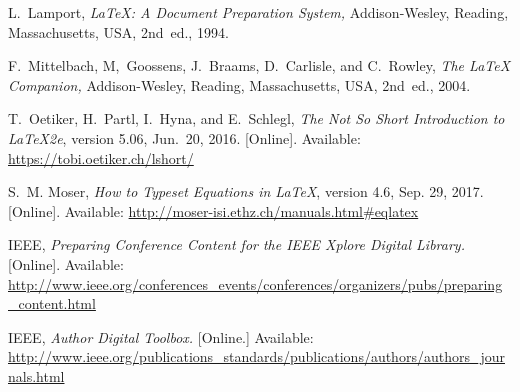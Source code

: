 \documentclass[conference,letterpaper]{IEEEtran}
\begin{document}
\begin{thebibliography}{9}

L.~Lamport,
  \emph{\LaTeX: A Document Preparation System,} 
  Addison-Wesley, Reading, Massachusetts, USA, 2nd~ed., 1994. 

F.~Mittelbach, M,~Goossens, J.~Braams, D.~Carlisle, and
C.~Rowley, \emph{The {\LaTeX} Companion,} Addison-Wesley,
Reading, Massachusetts, USA, 2nd~ed., 2004.

T.~Oetiker, H.~Partl, I.~Hyna, and E.~Schlegl, \emph{The Not So Short
  Introduction to {\LaTeX2e}}, version 5.06, Jun.~20, 2016. [Online].
  Available: \url{https://tobi.oetiker.ch/lshort/}

S.~M. Moser, \emph{How to Typeset Equations in {\LaTeX}}, version 4.6,
  Sep. 29, 2017. [Online]. Available:
  \url{http://moser-isi.ethz.ch/manuals.html#eqlatex}

IEEE, \emph{Preparing Conference Content for the IEEE Xplore Digital
  Library.} [Online]. Available:
  \url{http://www.ieee.org/conferences_events/conferences/organizers/pubs/preparing_content.html}

IEEE, \emph{Author Digital Toolbox.} [Online.] Available:
  \url{http://www.ieee.org/publications_standards/publications/authors/authors_journals.html}

\end{thebibliography}
\end{document}
